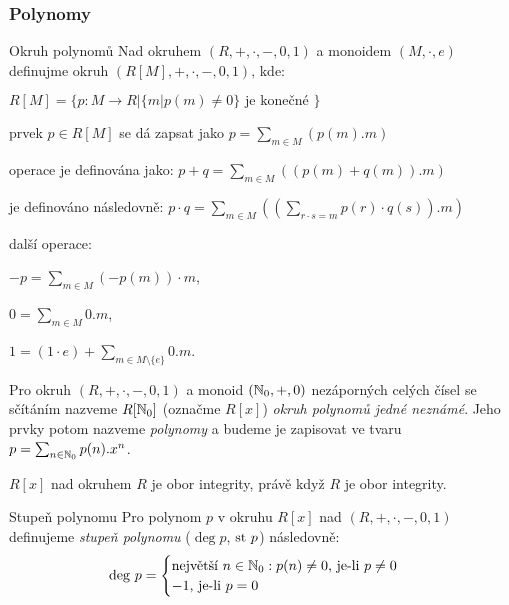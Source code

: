 \subsubsection*{Polynomy}

\begin{definiceN}{Okruh polynomů}
Nad okruhem $(R,+,\cdot,-,0,1)$ a monoidem $(M,\cdot,e)$ definujme okruh $(R[M],+,\cdot,-,0,1)\text{,}$ kde:
\begin{pitemize}
    \item $R[M]=\{ p:M\to R | \{m|p(m)\neq 0\} \text{ je konečné } \}$
    \item prvek $p\in R[M]$ se dá zapsat jako $p=\sum_{m\in M}(p(m).m)$
    \item operace \uv{$+$} je definována jako: $p+q=\sum_{m\in M}((p(m)+q(m)).m)$
    \item \uv{$\cdot$} je definováno následovně: $p\cdot q=\sum_{m\in M}((\sum_{r\cdot s=m} p(r)\cdot q(s)).m)$
    \item další operace:
    \begin{pitemize}
	\item $-p=\sum_{m\in M}(-p(m))\cdot m$,
	\item $0=\sum_{m\in M}0.m$,
	\item $1=(1\cdot e)+\sum_{m\in M\setminus\{e\}}0.m$.
    \end{pitemize}
\end{pitemize}
\par
Pro okruh $(R,+,\cdot,-,0,1)$ a monoid $(\mathbb{N}_0,+,0)$ nezáporných celých čísel se sčítáním nazveme $R[\mathbb{N}_0]$ (označme $R[x]$) \emph{okruh polynomů jedné neznámé}. Jeho prvky potom nazveme \emph{polynomy} a budeme je zapisovat ve tvaru $p=\sum_{n\in\mathbb{N}_0}p(n).x^n$. 
\end{definiceN}

\begin{poznamka}
$R[x]$ nad okruhem $R$ je obor integrity, právě když $R$ je obor integrity.
\end{poznamka}


\begin{definiceN}{Stupeň polynomu}
Pro polynom $p$ v okruhu $R[x]$ nad $(R,+,\cdot,-,0,1)$ definujeme \emph{stupeň polynomu} ($\deg p$, $\mathrm{st}\  p$) následovně: $$\mathrm{deg}\  p=\begin{cases}
\text{největší }n\in\mathbb{N}_0:p(n)\neq 0\text{, je-li }p\neq 0\\
-1\text{, je-li }p=0
\end{cases}$$
\end{definiceN}

